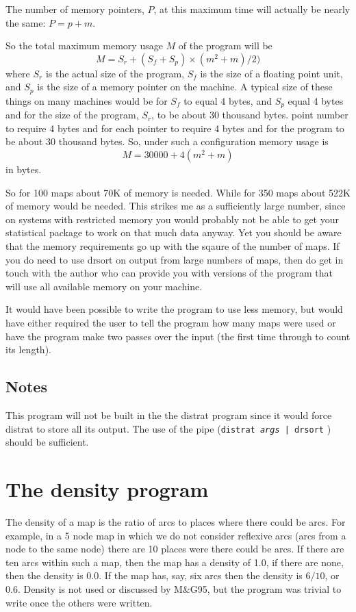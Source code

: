 \documentclass[%
	11pt,
        a4paper,
        twoside]{workrep}
\newcommand*{\prg}[1]{\textsf{#1}}		%
\newcommand*{\cmd}[1]{\texttt{#1}}		%
\newcommand{\MG}{M\&G95\xspace}			%
\begin{document}
The number of memory pointers, $P$, at this maximum time will
actually be nearly the same: $P = p + m$.

So the total maximum memory usage $M$ of the program will be
\[
M = S_r + (S_f + S_p)\times(m^2+m)/2)
\]
where $S_r$ is the actual size of the program, $S_f$ is the size
of a floating point unit, and $S_p$ is the size of a memory pointer
on the machine.
A typical size of these things on many machines would be for
$S_f$ to equal 4 bytes, and $S_p$ equal 4 bytes and for the size
of the program, $S_r$, to be about 30 thousand bytes.
point number to require 4 bytes and for each pointer to require 4
bytes and for the program to be about 30 thousand bytes.  So, under
such a configuration memory usage is
\[
M = 30000 + 4(m^2+m)
\]
in bytes.

So for 100 maps about 70K of memory is needed.  While for 350 maps
about 522K of memory would be needed.  This strikes me as a
sufficiently large number, since on systems with restricted memory
you would probably not be able to get your statistical package to
work on that much data anyway.  Yet you should be aware that the memory
requirements go up with the sqaure of the number of maps.
If you do need to use \prg{drsort} on output from large numbers
of maps, then do get in touch with the author who can provide
you with versions of the program that will use all available memory
on your machine.

It would have been possible to write the program to use less memory,
but would have either required the user to tell the program
how many maps were used or have the program make two passes
over the input (the first time through to count its length).

\section{Notes}

This program will not be built in the the \prg{distrat} program
since it would force \prg{distrat} to store all its
output.  The use of the pipe (\cmd{distrat \textit{args} | drsort} ) should
be sufficient.

\chapter{The \prg{density} program}\label{ch:density}

The density of a map is the ratio of arcs to places where there could
be arcs.  For example, in a 5 node map in which we do not consider
reflexive arcs (arcs from a node to the same node) there are 10
places were there could be arcs.  If there are ten arcs within such a
map, then the map has a density of 1.0, if there are none, then the
density is 0.0.  If the map has, say, six arcs then the density is
$6/10$, or 0.6.  Density is not used or discussed by \MG, but the program
was trivial to write once the others were written.
\end{document}
